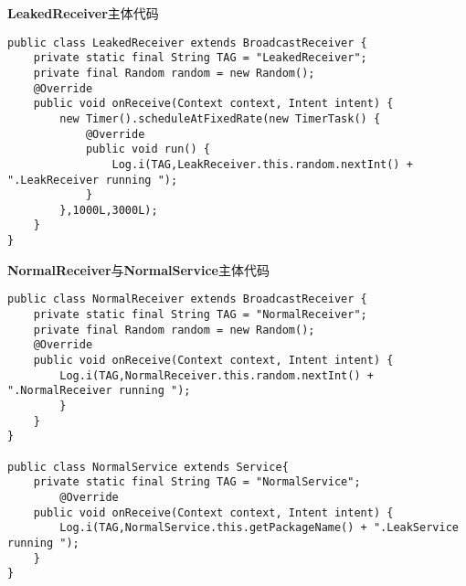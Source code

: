 \begin{listing}[htbp]
	\centering
	\caption{\textbf{LeakedReceiver}主体代码}
	\begin{verbatim}
public class LeakedReceiver extends BroadcastReceiver {
	private static final String TAG = "LeakedReceiver";
	private final Random random = new Random();
	@Override
	public void onReceive(Context context, Intent intent) {
		new Timer().scheduleAtFixedRate(new TimerTask() {
			@Override
			public void run() {
				Log.i(TAG,LeakReceiver.this.random.nextInt() + ".LeakReceiver running ");
			}
		},1000L,3000L);
	}
}
	\end{verbatim}
	\label{code:LeakedReceiver}
\end{listing}

\begin{listing}[htbp]
	\centering
	\caption{\textbf{NormalReceiver}与\textbf{NormalService}主体代码}
	\begin{verbatim}
public class NormalReceiver extends BroadcastReceiver {
	private static final String TAG = "NormalReceiver";
	private final Random random = new Random();
	@Override
	public void onReceive(Context context, Intent intent) {
		Log.i(TAG,NormalReceiver.this.random.nextInt() + ".NormalReceiver running ");
		}
	}
}

public class NormalService extends Service{
	private static final String TAG = "NormalService";
		@Override
	public void onReceive(Context context, Intent intent) {
		Log.i(TAG,NormalService.this.getPackageName() + ".LeakService running ");
	}
}
	\end{verbatim}
	\label{code:Normal}
\end{listing}

